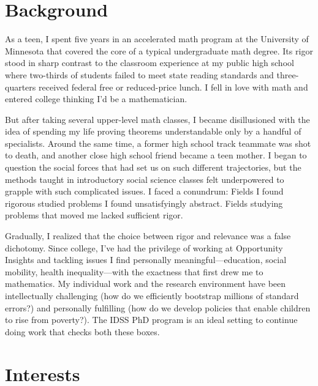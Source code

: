 \documentclass[header=false]{grad-statement}
\begin{document}
\section{Background}

As a teen, I spent five years in an accelerated math program at the University of Minnesota that covered the core of a typical undergraduate math degree.
Its rigor stood in sharp contrast to the classroom experience at my public high school where two-thirds of students failed to meet state reading standards and three-quarters received federal free or reduced-price lunch.
I fell in love with math and entered college thinking I'd be a mathematician.

But after taking several upper-level math classes, I became disillusioned with the idea of spending my life proving theorems understandable only by a handful of specialists.
Around the same time, a former high school track teammate was shot to death, and another close high school friend became a teen mother.
I began to question the social forces that had set us on such different trajectories, but the methods taught in introductory social science classes felt underpowered to grapple with such complicated issues.
I faced a conundrum:
Fields I found rigorous studied problems I found unsatisfyingly abstract.
Fields studying problems that moved me lacked sufficient rigor.

Gradually, I realized that the choice between rigor and relevance was a false dichotomy.
Since college, I've had the privilege of working at Opportunity Insights and tackling issues I find personally meaningful---education, social mobility, health inequality---with the exactness that first drew me to mathematics.
My individual work and the research environment have been intellectually challenging (how do we efficiently bootstrap millions of standard errors?) and personally fulfilling (how do we develop policies that enable children to rise from poverty?).
The IDSS PhD program is an ideal setting to continue doing work that checks both these boxes.

\section{Interests}

\end{document}
